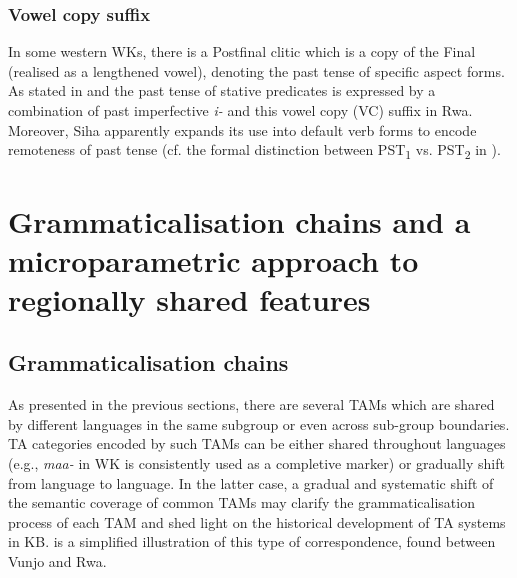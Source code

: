 \documentclass[output=paper]{langscibook}
\begin{document}
\subsubsection{Vowel copy suffix}\label{sec:shinagawa:3.3.3}

  In some western WKs, there is a Postfinal clitic which is a copy of the Final (realised as a lengthened vowel), denoting the past tense of specific aspect forms. As stated in  and  the past tense of stative predicates is expressed by a combination of past imperfective \textit{i-} and this vowel copy (VC) suffix in Rwa. Moreover, Siha apparently expands its use into default verb forms to encode remoteness of past tense (cf. the formal distinction between PST\textsubscript{1} vs. PST\textsubscript{2} in ).

\section{Grammaticalisation chains and a microparametric approach to regionally shared features}\label{sec:shinagawa:4}
\subsection{Grammaticalisation chains}\label{sec:shinagawa:4.1}

  As presented in the previous sections, there are several TAMs which are shared by different languages in the same subgroup or even across sub-group boundaries. TA categories encoded by such TAMs can be either shared throughout languages (e.g., \textit{maa-} in WK is consistently used as a completive marker) or gradually shift from language to language. In the latter case, a gradual and systematic shift of the semantic coverage of common TAMs may clarify the grammaticalisation process of each TAM and shed light on the historical development of TA systems in KB.  is a simplified illustration of this type of correspondence, found between Vunjo and Rwa.
\end{document}
